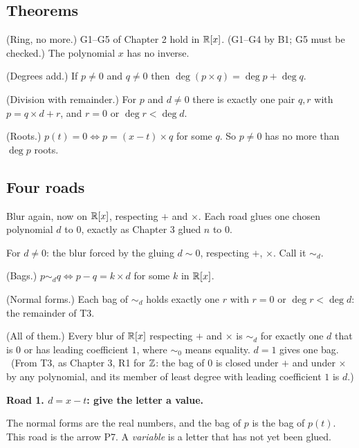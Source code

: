 \subsection*{Theorems}

\begin{lines}
\item[\lab{T1}] (Ring, no more.) G1--G5 of Chapter 2 hold in $\mathbb{R}[x]$. (G1--G4 by B1; G5 must be checked.) The polynomial $x$ has no inverse.
\item[\lab{T2}] (Degrees add.) If $p \neq 0$ and $q \neq 0$ then $\deg(p \times q) = \deg p + \deg q$.
\item[\lab{T3}] (Division with remainder.) For $p$ and $d \neq 0$ there is exactly one pair $q, r$ with $p = q \times d + r$, and $r = 0$ or $\deg r < \deg d$.
\item[\lab{T4}] (Roots.) $p(t) = 0 \iff p = (x - t) \times q$ for some $q$. So $p \neq 0$ has no more than $\deg p$ roots.
\end{lines}

\subsection*{Four roads}

Blur again, now on $\mathbb{R}[x]$, respecting $+$ and $\times$. Each road glues one chosen polynomial $d$ to $0$, exactly as Chapter 3 glued $n$ to $0$.

\begin{lines}
\item[\lab{B3}] For $d \neq 0$: the blur forced by the gluing $d \sim 0$, respecting $+$, $\times$. Call it $\sim_d$.
\item[\lab{P8}] (Bags.) $p \sim_d q \iff p - q = k \times d$ for some $k$ in $\mathbb{R}[x]$.
\item[\lab{P9}] (Normal forms.) Each bag of $\sim_d$ holds exactly one $r$ with $r = 0$ or $\deg r < \deg d$: the remainder of T3.
\item[\lab{P9.1}] (All of them.) Every blur of $\mathbb{R}[x]$ respecting $+$ and $\times$ is $\sim_d$ for exactly one $d$ that is $0$ or has leading coefficient $1$, where $\sim_0$ means equality. $d = 1$ gives one bag. \ (From T3, as Chapter 3, R1 for $\mathbb{Z}$: the bag of $0$ is closed under $+$ and under $\times$ by any polynomial, and its member of least degree with leading coefficient $1$ is $d$.)
\end{lines}

\textbf{Road 1. $d = x - t$: give the letter a value.}
\begin{lines}
\item[\lab{P10}] The normal forms are the real numbers, and the bag of $p$ is the bag of $p(t)$. This road is the arrow P7. A \emph{variable} is a letter that has not yet been glued.
\end{lines}

